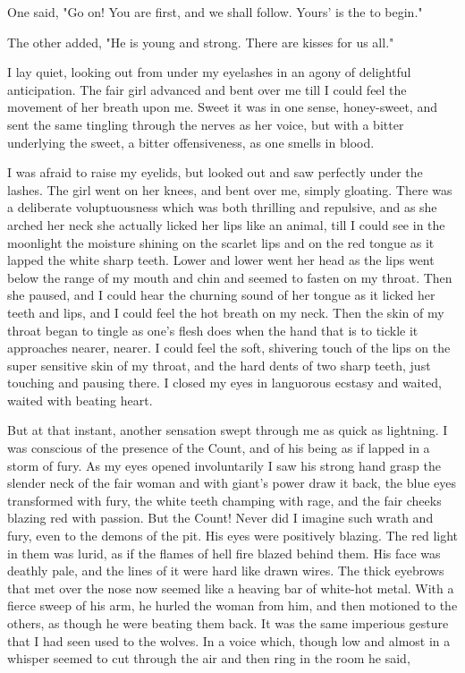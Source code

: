 \documentclass[10pt,a4paper]{article}
\newcommand{\glos}[3]{\dotuline{#1}\marginpar{\scriptsize\textit{#3} #2}}
\begin{document}
One said, "Go on! You are first, and we shall follow. Yours' is the \glos{right}{højre}{adj.} to begin."

The other added, "He is young and strong. There are kisses for us all."

I lay quiet, looking out from under my eyelashes in an agony of delightful anticipation. The fair girl advanced and bent over me till I could feel the movement of her breath upon me. Sweet it was in one sense, honey-sweet, and sent the same tingling through the nerves as her voice, but with a bitter underlying the sweet, a bitter offensiveness, as one smells in blood.

I was afraid to raise my eyelids, but looked out and saw perfectly under the lashes. The girl went on her knees, and bent over me, simply gloating. There was a deliberate voluptuousness which was both thrilling and repulsive, and as she arched her neck she actually licked her lips like an animal, till I could see in the moonlight the moisture shining on the scarlet lips and on the red tongue as it lapped the white sharp teeth. Lower and lower went her head as the lips went below the range of my mouth and chin and seemed to fasten on my throat. Then she paused, and I could hear the churning sound of her tongue as it licked her teeth and lips, and I could feel the hot breath on my neck. Then the skin of my throat began to tingle as one's flesh does when the hand that is to tickle it approaches nearer, nearer. I could feel the soft, shivering touch of the lips on the super sensitive skin of my throat, and the hard dents of two sharp teeth, just touching and pausing there. I closed my eyes in languorous ecstasy and waited, waited with beating heart.

But at that instant, another sensation swept through me as quick as lightning. I was conscious of the presence of the Count, and of his being as if lapped in a storm of fury. As my eyes opened involuntarily I saw his strong hand grasp the slender neck of the fair woman and with giant's power draw it back, the blue eyes transformed with fury, the white teeth champing with rage, and the fair cheeks blazing red with passion. But the Count! Never did I imagine such wrath and fury, even to the demons of the pit. His eyes were positively blazing. The red light in them was lurid, as if the flames of hell fire blazed behind them. His face was deathly pale, and the lines of it were hard like drawn wires. The thick eyebrows that met over the nose now seemed like a heaving bar of white-hot metal. With a fierce sweep of his arm, he hurled the woman from him, and then motioned to the others, as though he were beating them back. It was the same imperious gesture that I had seen used to the wolves. In a voice which, though low and almost in a whisper seemed to cut through the air and then ring in the room he said,
\end{document}
